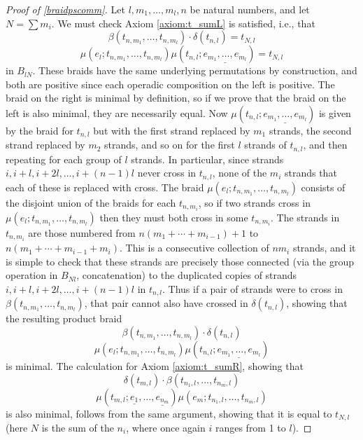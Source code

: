 \begin{proof}[Proof of \cref{braidpscomm}]
Let $l, m_{1}, \ldots, m_{l}, n$ be natural numbers, and let $N = \sum m_{i}$. We must check Axiom \ref{axiom:t_sumL} is satisfied, i.e., that
  \[
    \beta(t_{n, m_{1}}, \ldots, t_{n, m_{l}}) \cdot \delta(t_{n,l}) = t_{N, l}
  \]
  \[
    \mu(e_{l}; t_{n, m_{1}}, \ldots, t_{n, m_{l}}) \mu\left(t_{n,l}; \underline{e_{m_{1}}, \ldots, e_{m_{l}}}\right) = t_{N, l}
  \]
in $B_{lN}$. These braids have the same underlying permutations by construction, and both are positive since each operadic composition on the left is positive. The braid on the right is minimal by definition, so if we prove that the braid on the left is also minimal, they are necessarily equal. Now $\mu\left(t_{n,l}; \underline{e_{m_{1}}, \ldots, e_{m_{l}}}\right)$ is given by the braid for $t_{n,l}$ but with the first strand replaced by $m_{1}$ strands, the second strand replaced by $m_{2}$ strands, and so on for the first $l$ strands of $t_{n,l}$, and then repeating for each group of $l$ strands. In particular, since strands $i, i+l, i+2l, \ldots, i + (n-1)l$ never cross in $t_{n,l}$, none of the $m_{i}$ strands that each of these is replaced with cross. The braid $\mu(e_{l}; t_{n, m_{1}}, \ldots, t_{n, m_{l}})$ consists of the disjoint union of the braids for each $t_{n,m_{i}}$, so if two strands cross in $\mu(e_{l}; t_{n, m_{1}}, \ldots, t_{n, m_{l}})$ then they must both cross in some $t_{n,m_{i}}$. The strands in $t_{n,m_{i}}$ are those numbered from $n(m_{1} + \cdots + m_{i-1}) + 1$ to $n(m_{1} + \cdots + m_{i-1} + m_{i})$. This is a consecutive collection of $nm_{i}$ strands, and it is simple to check that these strands are precisely those connected (via the group operation in $B_{Nl}$, concatenation) to the duplicated copies of strands $i, i+l, i+2l, \ldots, i + (n-1)l$ in $t_{n,l}$. Thus if a pair of strands were to cross in
$\beta(t_{n, m_{1}}, \ldots, t_{n, m_{l}})$, that pair cannot also have crossed in
$\delta(t_{n,l})$, showing that the resulting product braid
  \[
    \beta(t_{n, m_{1}}, \ldots, t_{n, m_{l}}) \cdot \delta(t_{n,l})
  \]
  \[
    \mu(e_{l}; t_{n, m_{1}}, \ldots, t_{n, m_{l}}) \mu\left(t_{n,l}; \underline{e_{m_{1}}, \ldots, e_{m_{l}}}\right)
  \]
is minimal. The calculation for Axiom \ref{axiom:t_sumR}, showing that
  \[
    \delta(t_{m,l}) \cdot \beta(t_{n_{1}, l}, \ldots, t_{n_{m}, l})
  \]
  \[
    \mu\left(t_{m,l}; \underline{e_{1}}, \ldots, \underline{e_{n_{m}}}\right) \mu\left(e_{m}; t_{n_{1}, l}, \ldots, t_{n_{m}, l}\right)
  \]
is also minimal, follows from the same argument, showing that it is equal to $t_{N, l}$ (here $N$ is the sum of the $n_{i}$, where once again $i$ ranges from 1 to $l$).


\end{proof}
